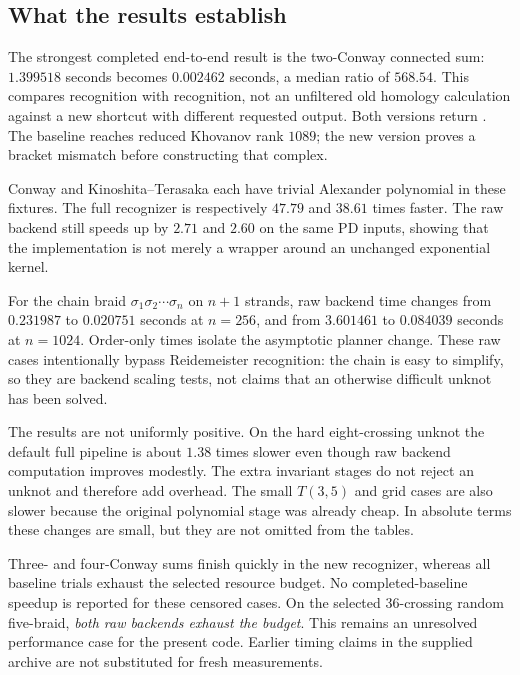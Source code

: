 \documentclass[11pt]{article}
\theoremstyle{remark}\newtheorem{remark}[theorem]{Remark}
\newcommand{\code}[1]{\texttt{\detokenize{#1}}}
\begin{document}

\clearpage

\subsection{What the results establish}
The strongest completed end-to-end result is the two-Conway connected sum:
$1.399518$ seconds becomes $0.002462$ seconds, a median ratio of $568.54$.
This compares recognition with recognition, not an unfiltered old homology
calculation against a new shortcut with different requested output. Both
versions return \code{KNOTTED}. The baseline reaches reduced Khovanov rank
$1089$; the new version proves a bracket mismatch before constructing that
complex.

Conway and Kinoshita--Terasaka each have trivial Alexander polynomial in these
fixtures. The full recognizer is respectively $47.79$ and $38.61$ times faster.
The raw backend still speeds up by $2.71$ and $2.60$ on the same PD inputs,
showing that the implementation is not merely a wrapper around an unchanged
exponential kernel.

For the chain braid $\sigma_1\sigma_2\cdots\sigma_n$ on $n+1$ strands, raw
backend time changes from $0.231987$ to $0.020751$ seconds at $n=256$, and from
$3.601461$ to $0.084039$ seconds at $n=1024$. Order-only times isolate the
asymptotic planner change. These raw cases intentionally bypass Reidemeister
recognition: the chain is easy to simplify, so they are backend scaling tests,
not claims that an otherwise difficult unknot has been solved.

The results are not uniformly positive. On the hard eight-crossing unknot the
default full pipeline is about $1.38$ times slower even though raw backend
computation improves modestly. The extra invariant stages do not reject an
unknot and therefore add overhead. The small $T(3,5)$ and grid cases are also
slower because the original polynomial stage was already cheap. In absolute
terms these changes are small, but they are not omitted from the tables.

Three- and four-Conway sums finish quickly in the new recognizer, whereas all
baseline trials exhaust the selected resource budget. No completed-baseline
speedup is reported for these censored cases. On the selected 36-crossing
random five-braid, \emph{both raw backends exhaust the budget}. This remains an
unresolved performance case for the present code. Earlier timing claims in
the supplied archive are not substituted for fresh measurements.
\end{document}
